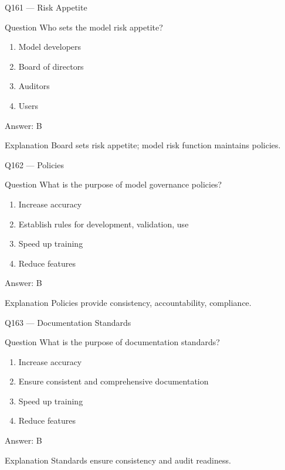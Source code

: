 \documentclass[aspectratio=169,8pt]{beamer}
\begin{document}
	\begin{frame}{Q161 --- Risk Appetite}
		\begin{block}{Question}
			Who sets the model risk appetite?
		\end{block}
		\begin{enumerate}
			\item Model developers
			\item Board of directors
			\item Auditors
			\item Users
		\end{enumerate}
		\begin{exampleblock}{Answer: B}\end{exampleblock}
		\begin{block}{Explanation}
			Board sets risk appetite; model risk function maintains policies.
		\end{block}
	\end{frame}
	
	\begin{frame}{Q162 --- Policies}
		\begin{block}{Question}
			What is the purpose of model governance policies?
		\end{block}
		\begin{enumerate}
			\item Increase accuracy
			\item Establish rules for development, validation, use
			\item Speed up training
			\item Reduce features
		\end{enumerate}
		\begin{exampleblock}{Answer: B}\end{exampleblock}
		\begin{block}{Explanation}
			Policies provide consistency, accountability, compliance.
		\end{block}
	\end{frame}
	
	\begin{frame}{Q163 --- Documentation Standards}
		\begin{block}{Question}
			What is the purpose of documentation standards?
		\end{block}
		\begin{enumerate}
			\item Increase accuracy
			\item Ensure consistent and comprehensive documentation
			\item Speed up training
			\item Reduce features
		\end{enumerate}
		\begin{exampleblock}{Answer: B}\end{exampleblock}
		\begin{block}{Explanation}
			Standards ensure consistency and audit readiness.
		\end{block}
	\end{frame}
	
\end{document}
